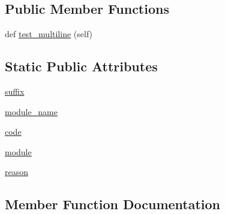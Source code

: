 \subsection*{Public Member Functions}
\begin{DoxyCompactItemize}
\item 
def \hyperlink{classnumpy_1_1f2py_1_1tests_1_1test__semicolon__split_1_1TestMultiline_afc9df4aba38447de0ddc769310facfb4}{test\+\_\+multiline} (self)
\end{DoxyCompactItemize}
\subsection*{Static Public Attributes}
\begin{DoxyCompactItemize}
\item 
\hyperlink{classnumpy_1_1f2py_1_1tests_1_1test__semicolon__split_1_1TestMultiline_abb224174c2dbee072d974903ea25194c}{suffix}
\item 
\hyperlink{classnumpy_1_1f2py_1_1tests_1_1test__semicolon__split_1_1TestMultiline_a90397e3ba78e065333219bf61ef27992}{module\+\_\+name}
\item 
\hyperlink{classnumpy_1_1f2py_1_1tests_1_1test__semicolon__split_1_1TestMultiline_ab74cbb19e3c997e95f7c001f3a18a2ec}{code}
\item 
\hyperlink{classnumpy_1_1f2py_1_1tests_1_1test__semicolon__split_1_1TestMultiline_a045cc2a72b2f21b0ed429e4cd1311f81}{module}
\item 
\hyperlink{classnumpy_1_1f2py_1_1tests_1_1test__semicolon__split_1_1TestMultiline_a0b5a0b9b665a0d9fc9bb56a37e6d7505}{reason}
\end{DoxyCompactItemize}


\subsection{Member Function Documentation}
\mbox{\label{classnumpy_1_1f2py_1_1tests_1_1test__semicolon__split_1_1TestMultiline_afc9df4aba38447de0ddc769310facfb4}} 
